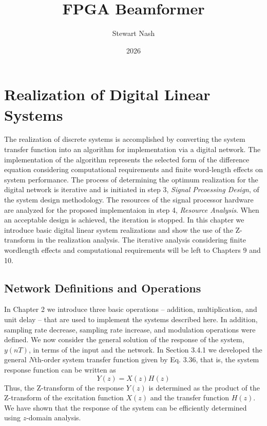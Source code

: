 \documentclass[11pt]{report}
\theoremstyle{example}
\begin{document}
\title{FPGA Beamformer}
\author{Stewart Nash}
\date{2026}

\maketitle

\chapter{Realization of Digital Linear Systems}

The realization of discrete systems is accomplished by converting the system transfer function into an algorithm for implementation via a digital network. The implementation of the algorithm represents the selected form of the difference equation considering computational requirements and finite word-length effects on system performance. The process of determining the optimum realization for the digital network is iterative and is initiated in step 3, \emph{Signal Prcoessing Design}, of the system design methodology. The resources of the signal processor hardware are analyzed for the proposed implementaion in step 4, \emph{Resource Analysis}. When an acceptable design is achieved, the iteration is stopped. In this chapter we introduce basic digital linear system realizations and show the use of the Z-transform in the realization analysis. The iterative analysis considering finite wordlength effects and computational requirements will be left to Chapters 9 and 10.

\section{Network Definitions and Operations}

In Chapter 2 we introduce three basic operations -- addition, multiplication, and unit delay -- that are used to implement the systems described here. In addition, sampling rate decrease, sampling rate increase, and modulation operations were defined. We now consider the general solution of the response of the system, $y(nT)$, in terms of the input and the network. In Section 3.4.1 we developed the general $N$th-order system transfer function given by Eq. 3.36, that is, the system response function can be written as
\begin{equation}
	Y(z)=X(z)H(z)
\end{equation}
Thus, the Z-transform of the response $Y(z)$ is determined as the product of the Z-transform of the excitation function $X(z)$ and the transfer function $H(z)$. We have shown that the response of the system can be efficiently determined using $z$-domain analysis.\\
\end{document}
